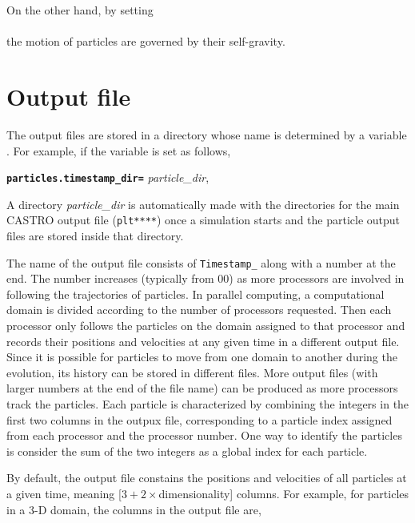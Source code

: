 \vspace{0.1in}
\noindent On the other hand, by setting \\

 \\

the motion of particles are governed by their self-gravity.




\section{Output file}
\label{particles:output_file}
\noindent The output files are stored in a directory whose name is determined by a variable \\
. For example, if the variable is set as follows,

\vspace{0.1in}
{\tt  {\bf particles.timestamp\_dir=}} {\em particle\_dir},
\vspace{0.1in}

\noindent A directory {\em particle\_dir} is automatically made with the directories for the main CASTRO output file ({\tt plt****}) once a simulation starts and the particle output files are stored inside that directory.

\vspace{0.05in}
\noindent The name of the output file consists of {\tt Timestamp\_} along with a number at the end. The number increases (typically from 00) as more processors are involved in following the trajectories of particles. In parallel computing, a computational domain is divided according to the number of processors requested. Then each processor only follows the particles on the domain assigned to that processor and records their positions and velocities at any given time in a different output file. Since it is possible for particles to move from one domain to another during the evolution, its history can be stored in different files. More output files (with larger numbers at the end of the file name) can be produced as more processors track the particles. Each particle is characterized by combining the integers in the first two columns in the outpux file, corresponding to a particle index assigned from each processor and the processor number. One way to identify the particles is consider the sum of the two integers as a global index for each particle. 

\vspace{0.05in}
\noindent By default, the output file constains the positions and velocities of all particles at a given time, meaning [$3+ 2\times$dimensionality] columns. For example, for particles in a 3-D domain, the columns in the output file are, 

